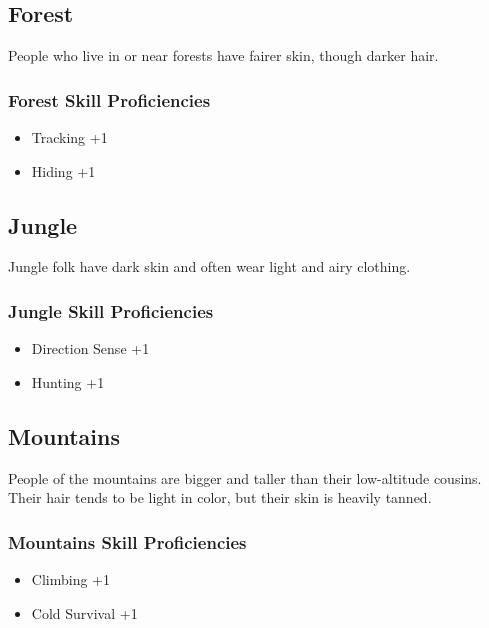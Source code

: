 \begin{multicols}{2}
\subsection{Forest}

People who live in or near forests have fairer skin, though darker
hair.

\subsubsection{Forest Skill Proficiencies}

\begin{itemize}
    \item Tracking +1
    \item Hiding +1
\end{itemize}

\subsection{Jungle}

Jungle folk have dark skin and often wear light and airy clothing.

\subsubsection{Jungle Skill Proficiencies}

\begin{itemize}
    \item Direction Sense +1
    \item Hunting +1
\end{itemize}

\subsection{Mountains}

People of the mountains are bigger and taller than their low-altitude
cousins. Their hair tends to be light in color, but their skin is heavily
tanned.

\subsubsection{Mountains Skill Proficiencies}

\begin{itemize}
    \item Climbing +1
    \item Cold Survival +1
\end{itemize}


\end{multicols}

